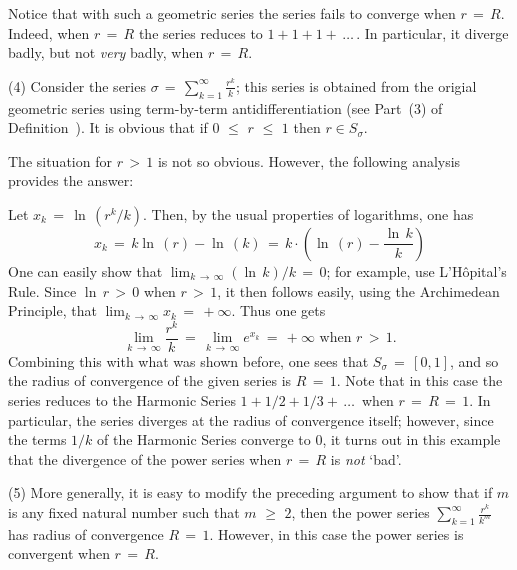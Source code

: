         Notice that with such a geometric series the series fails to converge when $r \,=\, R$.
    Indeed, when $r \,=\, R$ the series reduces to $1+1+1+\,{\ldots}\,$. In particular, it diverge badly, but not {\em very} badly, when $r \,=\, R$.

\V

        (4) Consider the series ${\displaystyle {\sigma} \,=\, \sum_{k=1}^{{\infty}} \frac{r^{k}}{k}}$;
    this series is obtained from the origial geometric series using term-by-term antidifferentiation (see Part~(3) of Definition~).
    It is obvious that if $0\,\,{\leq}\,\,r\,\,{\leq}\,\,1$ then $r{\in}S_{{\sigma}}$.

        The situation for $r\,>\,1$ is not so obvious. However, the following analysis provides the answer:

        Let $x_{k} \,=\, {\ln}\,(r^{k}/k)$. Then, by the usual properties of logarithms, one has
        \begin{displaymath}
        x_{k} \,=\, k{\ln}\,(r) - {\ln}\,(k) \,=\,
    k{\cdot}\left({\ln}\,(r) - \frac{{\ln}\,k}{k}\right)
        \end{displaymath}
    One can easily show that $\lim_{k \,{\rightarrow}\, {\infty}} ({\ln}\,k)/k \,=\, 0$; for example, use L'H\^{o}pital's Rule.
    Since ${\ln}\,r\,>\,0$ when $r\,>\,1$, it then follows easily, using the Archimedean Principle, that $\lim_{k \,{\rightarrow}\, {\infty}} x_{k} \,=\, +{\infty}$. Thus one gets
        \begin{displaymath}
        \lim_{k \,{\rightarrow}\, {\infty}} \frac{r^{k}}{k} \,=\, \lim_{k \,{\rightarrow}\, {\infty}} e^{x_{k}} \,=\, +{\infty} \mbox{ when $r\,>\,1$}.
        \end{displaymath}
    Combining this with what was shown before, one sees that $S_{{\sigma}} \,=\, [0,1]$, and so the radius of convergence of the given series is $R \,=\, 1$.
    Note that in this case the series reduces to the Harmonic Series $1+1/2+1/3+\,{\ldots}\,$ when $r \,=\, R \,=\, 1$. In particular, the series diverges at the radius of convergence itself;
    however, since the terms $1/k$ of the Harmonic Series converge to $0$, it turns out in this example that the divergence of the power series when $r \,=\, R$ is {\em not} `bad'.

\V

        (5) More generally, it is easy to modify the preceding argument to show that if $m$ is any fixed natural number such that $m\,\,{\geq}\,\,2$, then the power series ${\displaystyle \sum_{k=1}^{{\infty}} \frac{r^{k}}{k^{m}}}$ has radius of convergence $R \,=\, 1$.
    However, in this case the power series is convergent when $r \,=\, R$.

